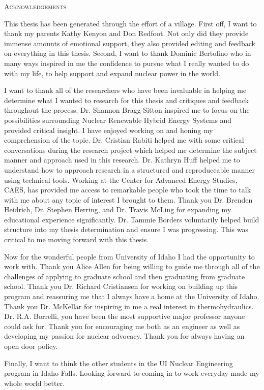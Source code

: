 \documentclass[12pt]{UIdahoMastersThesis}
\begin{document}
 \begin{center}
 	{\LARGE\textsc{Acknowledgements}}

    This thesis has been generated through the effort of a village.  First off, I want to thank my parents Kathy Kenyon and Don Redfoot.  Not only did they provide immense amounts of emotional support, they also provided editing and feedback on everything in this thesis. Second, I want to thank Dominic Bertolino who in many ways inspired in me the confidence to pursue what I really wanted to do with my life, to help support and expand nuclear power in the world.


I want to thank all of the researchers who have been invaluable in helping me determine what I wanted to research for this thesis and critiques and feedback throughout the process. Dr. Shannon Bragg-Sitton inspired me to focus on the possibilities surrounding Nuclear Renewable Hybrid Energy Systems and provided critical insight. I have enjoyed working on and honing my comprehension of the topic. Dr. Cristian Rabiti helped me with some critical conversations during the research project which helped me determine the subject manner and approach used in this research. Dr. Kathryn Huff helped me to understand how to approach research in a structured and reproduceable manner using technical tools. Working at the Center for Advanced Energy Studies, CAES, has provided me access to remarkable people who took the time to talk with me about any topic of interest I brought to them. Thank you Dr. Brenden Heidrich, Dr. Stephen Herring, and Dr. Travis McLing for expanding my educational experience significantly.  Dr. Tammie Borders voluntarily helped build structure into my thesis determination and ensure I was  progressing.  This was critical to me moving forward with this thesis.


Now for the wonderful people from University of Idaho I had the opportunity to work with.  Thank you Alice Allen for being willing to guide me through all of the challenges of applying to graduate school and then graduating from graduate school. Thank you Dr. Richard Cristiansen for working on building up this program and reassuring me that I always have a home at the University of Idaho. Thank you Dr. McKellar for inspiring in me a real interest in thermohydraulics.  Dr. R.A. Borrelli, you have been the most supportive major professor anyone could ask for. Thank you for encouraging me both as an engineer as well as developing my passion for nuclear advocacy.  Thank you for always having an open door policy.

Finally, I want to think the other students in the UI Nuclear Engineering program in Idaho Falls. Looking forward to coming in to work everyday made my whole world better.

 \end{center}
\end{document}
